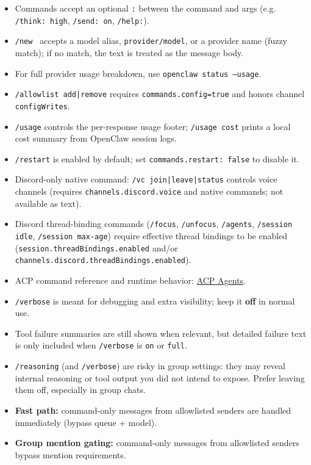 \begin{itemize}
  \item Commands accept an optional \texttt{:} between the command and args (e.g. \texttt{/think: high}, \texttt{/send: on}, \texttt{/help:}).
  \item \texttt{/new } accepts a model alias, \texttt{provider/model}, or a provider name (fuzzy match); if no match, the text is treated as the message body.
  \item For full provider usage breakdown, use \texttt{openclaw status --usage}.
  \item \texttt{/allowlist add|remove} requires \texttt{commands.config=true} and honors channel \texttt{configWrites}.
  \item \texttt{/usage} controls the per-response usage footer; \texttt{/usage cost} prints a local cost summary from OpenClaw session logs.
  \item \texttt{/restart} is enabled by default; set \texttt{commands.restart: false} to disable it.
  \item Discord-only native command: \texttt{/vc join|leave|status} controls voice channels (requires \texttt{channels.discord.voice} and native commands; not available as text).
  \item Discord thread-binding commands (\texttt{/focus}, \texttt{/unfocus}, \texttt{/agents}, \texttt{/session idle}, \texttt{/session max-age}) require effective thread bindings to be enabled (\texttt{session.threadBindings.enabled} and/or \texttt{channels.discord.threadBindings.enabled}).
  \item ACP command reference and runtime behavior: \href{/tools/acp-agents}{ACP Agents}.
  \item \texttt{/verbose} is meant for debugging and extra visibility; keep it \textbf{off} in normal use.
  \item Tool failure summaries are still shown when relevant, but detailed failure text is only included when \texttt{/verbose} is \texttt{on} or \texttt{full}.
  \item \texttt{/reasoning} (and \texttt{/verbose}) are risky in group settings: they may reveal internal reasoning or tool output you did not intend to expose. Prefer leaving them off, especially in group chats.
  \item \textbf{Fast path:} command-only messages from allowlisted senders are handled immediately (bypass queue + model).
  \item \textbf{Group mention gating:} command-only messages from allowlisted senders bypass mention requirements.

\end{itemize}

